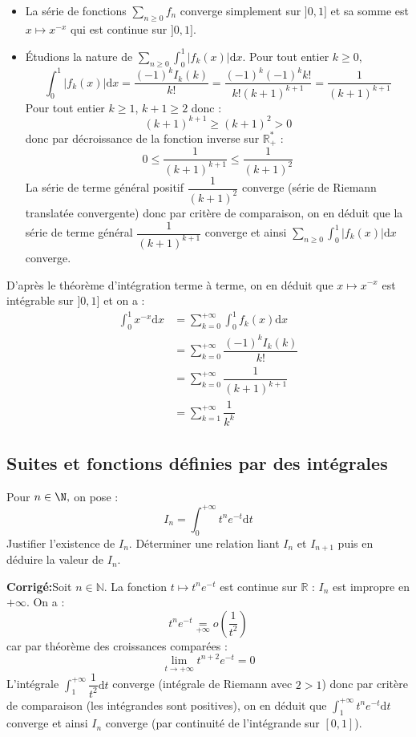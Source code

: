 \documentclass[a4paper,twoside,french,10pt]{VcCours}
\newcommand{\dx}{\text{d}x}
\newcommand{\dt}{\text{d}t}
\newcommand{\corr}{\textbf{Corrigé:}}
\begin{document}
\begin{enumerate}
\begin{itemize}
\item La série de fonctions $\sum_{n \geq 0} f_n$ converge simplement sur $]0,1]$ et sa somme est $x \mapsto x^{-x}$ qui est continue sur $]0,1]$.
\item Étudions la nature de $\sum_{n \geq 0} \int_0^1 \vert f_k(x) \vert\dx$. Pour tout entier $k \geq 0$,
$$ \int_0^1 \vert f_k(x) \vert\dx = \dfrac{(-1)^k I_k(k)}{k!} = \dfrac{(-1)^k(-1)^k k!}{k! (k+1)^{k+1}} = \dfrac{1}{(k+1)^{k+1}}$$
Pour tout entier $k \geq 1$, $k+1 \geq 2$ donc : 
$$ (k+1)^{k+1} \geq (k+1)^2 >0$$
donc par décroissance de la fonction inverse sur $\mathbb{R}_+^{*}$ :
$$ 0 \leq \dfrac{1}{(k+1)^{k+1}} \leq \dfrac{1}{(k+1)^2}$$
La série de terme général positif $\dfrac{1}{(k+1)^2}$ converge (série de Riemann translatée convergente) donc par critère de comparaison, on en déduit que la série de terme général $\dfrac{1}{(k+1)^{k+1}}$ converge et ainsi $\sum_{n \geq 0} \int_0^1 \vert f_k(x) \vert\dx$ converge.
\end{itemize}
D'après le théorème d'intégration terme à terme, on en déduit que $x \mapsto x^{-x}$ est intégrable sur $]0,1]$ et on a :
\begin{align*}
\int_0^1 x^{-x} \dx & = \sum_{k=0}^{+ \infty} \int_0^1 f_k(x) \dx \\
& = \sum_{k=0}^{+ \infty} \dfrac{(-1)^k I_k(k)}{k!} \\
& = \sum_{k=0}^{+ \infty} \dfrac{1}{(k+1)^{k+1}} \\
& = \sum_{k=1}^{+ \infty} \dfrac{1}{k^k}
\end{align*}
\end{enumerate}


\medskip


\subsection{Suites et fonctions définies par des intégrales}


\medskip

\begin{Exercice}{} Pour $n\in\N,$ on pose :
$$I_n=\int_0^{+\infty} t^ne^{-t} \dt$$
Justifier l'existence de $I_n$. Déterminer une relation liant $I_n$ et $I_{n+1}$ puis en déduire la valeur de $I_n.$
\end{Exercice} 

\corr Soit $n \in \mathbb{N}$. La fonction $t \mapsto  t^ne^{-t}$ est continue sur $\mathbb{R}$ : $I_n$ est impropre en $+ \infty$. On a :
$$ t^n e^{-t} \underset{ +\infty}{=} o \left( \dfrac{1}{t^2} \right)$$
car par théorème des croissances comparées :
$$ \lim_{t \rightarrow + \infty} t^{n+2} e^{-t}=0$$
L'intégrale $\int_1^{+ \infty} \dfrac{1}{t^2} \dt$ converge (intégrale de Riemann avec $2>1$) donc par critère de comparaison (les intégrandes sont positives), on en déduit que $\int_1^{+ \infty} t^n e^{-t} \dt$ converge et ainsi $I_n$ converge (par continuité de l'intégrande sur $[0,1]$).
\end{document}
